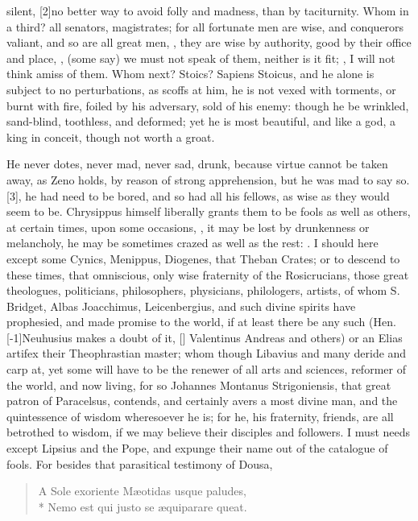 silent,  [2\baselineskip]no better way to avoid folly
and madness, than by taciturnity. Whom in a third? all senators,
magistrates; for all fortunate men are wise, and conquerors valiant,
and so are all great men, , they are wise
by authority, good by their office and place, , (some say) we must not speak of them, neither is it fit; , I will not think amiss of them. Whom next?
Stoics? Sapiens Stoicus, and he alone is subject to no perturbations,
as  scoffs at him, he is not vexed with torments, or burnt
with fire, foiled by his adversary, sold of his enemy: though he be
wrinkled, sand-blind, toothless, and deformed; yet he is most
beautiful, and like a god, a king in conceit, though not worth a groat.

He never dotes, never mad, never sad, drunk, because virtue cannot be
taken away, as Zeno holds, by reason of strong apprehension, but
he was mad to say so. [3\baselineskip],
he had need to be bored, and so had all his fellows, as wise as they
would seem to be. Chrysippus himself liberally grants them to be fools
as well as others, at certain times, upon some occasions, , it may be lost by
drunkenness or melancholy, he may be sometimes crazed as well as the
rest: . I should here
except some Cynics, Menippus, Diogenes, that Theban Crates; or to
descend to these times, that omniscious, only wise fraternity of
the Rosicrucians, those great theologues, politicians, philosophers,
physicians, philologers, artists, \etc{} of whom S. Bridget, Albas
Joacchimus, Leicenbergius, and such divine spirits have prophesied, and
made promise to the world, if at least there be any such (Hen.
[-1\baselineskip]Neuhusius makes a doubt of it, [\baselineskip] Valentinus Andreas and
others) or an Elias artifex their Theophrastian master; whom though
Libavius and many deride and carp at, yet some will have to be the
renewer of all arts and sciences, reformer of the world, and now
living, for so Johannes Montanus Strigoniensis, that great patron of
Paracelsus, contends, and certainly avers a most divine man, and
the quintessence of wisdom wheresoever he is; for he, his fraternity,
friends, \etc{} are all betrothed to wisdom, if we may believe their
disciples and followers. I must needs except Lipsius and the Pope, and
expunge their name out of the catalogue of fools. For besides that
parasitical testimony of Dousa,
%
\begin{verse}
\textlatin{A Sole exoriente M\ae{}otidas usque paludes,}\\*
\textlatin{Nemo est qui justo se \ae{}quiparare queat.}
\end{verse}

